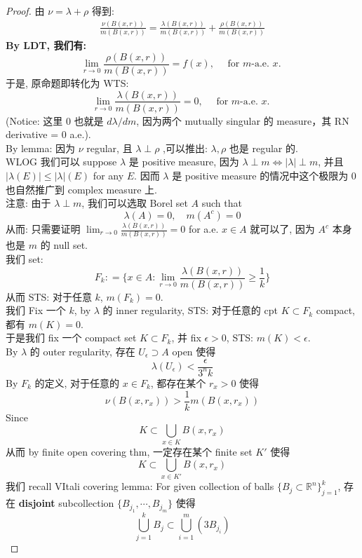 \documentclass[lang=cn,11pt]{elegantbook}
\begin{document}
\begin{proof}
由 $\nu=\lambda+\rho$ 得到:
$$
\begin{aligned}
\frac{\nu(B(x, r))}{m(B(x, r))}=\frac{\lambda(B(x, r))}{m(B(x, r))}+\frac{\rho(B(x, r))}{m(B(x, r))}
\end{aligned}
$$
\textbf{By LDT, 我们有: }$$
\lim _{r \rightarrow 0} \frac{\rho(B(x, r))}{m(B(x, r))}=f(x), \quad \text { for } m \text {-a.e. } x \text {. }
$$
于是, 原命题即转化为 WTS: $$
\lim _{r \rightarrow 0} \frac{\lambda(B(x, r))}{m(B(x, r))}=0, \quad \text { for } m \text {-a.e. } x \text {. }
$$
(Notice: 这里 $0$ 也就是 $d \lambda / dm$, 因为两个 mutually singular 的 measure，其 RN derivative = $0$ a.e.).\\
By lemma: 因为 $\nu$ regular, 且 $\lambda \perp \rho $ ,可以推出: $\lambda,\rho $ 也是 regular 的.\\
WLOG 我们可以 suppose $\lambda$ 是 positive measure, 因为 $\lambda \perp m \iff |\lambda| \perp m$, 并且$|\lambda (E)| \leq |\lambda|(E)$ for any $E$. 因而 $\lambda$ 是 positive measure 的情况中这个极限为 $0$ 也自然推广到 complex measure 上.\\
注意: 由于 $\lambda \perp m$, 我们可以选取 Borel set $A$ such that \[
\lambda(A) = 0, \quad m(A^c) = 0
\]从而: 只需要证明 $\lim _{r \rightarrow 0} \frac{\lambda(B(x, r))}{m(B(x, r))}=0$ for a.e. $x\in A$ 就可以了, 因为 $A^c$ 本身也是 $m$ 的 null set.\\
我们 set: \[
F_k : = \bigg\{x\in A : \lim _{r \rightarrow 0} \frac{\lambda(B(x, r))}{m(B(x, r))}\geq  \frac{1}{k}  \bigg\}
\]
从而 STS: 对于任意 $k$, $m(F_k) = 0$.\\
我们 Fix 一个 $k$, by $\lambda$ 的 inner regularity, STS: 对于任意的 cpt $K \subset F_k$ compact, 都有 $m(K) = 0$. \\
于是我们 fix 一个 compact set $K\subset F_k$, 并 fix $\epsilon > 0$, STS: $m(K) < \epsilon$.\\
By $\lambda$ 的 outer regularity, 存在 $U_{\epsilon}\supset A$ open 使得 \[
\lambda (U_\epsilon) < \frac{\epsilon}{3^n k }
\]
By $F_k$ 的定义, 对于任意的 $x\in F_k$, 都存在某个 $r_x > 0$ 使得 \[
\nu(B(x,r_x) ) > \frac{1}{k} m(B(x,r_x) )
\]
Since \[
K \subset \bigcup_{x\in K} B(x,r_x)
\]从而 by finite open covering thm, 一定存在某个 finite set $K'$ 使得 \[
K \subset \bigcup_{x\in K'} B(x,r_x)
\]
我们 recall VItali covering lemma: For given collection of balls $\{B_j \subset \mathbb{R}^n\}_{j=1}^k$, 存在 \textbf{disjoint} subcollection $\{B_{j_1},\cdots, B_{j_m}\}$ 使得\[
\bigcup_{j=1}^k B_j  \subset \bigcup_{i=1}^m (3B_{j_i}) 
    \]

\end{proof}
\end{document}
